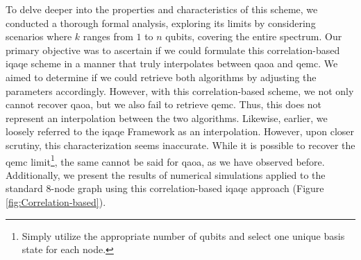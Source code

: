 To delve deeper into the properties and characteristics of this scheme, we conducted a thorough formal analysis, exploring its limits by considering scenarios where $k$ ranges from $1$ to $n$ qubits, covering the entire spectrum. Our primary objective was to ascertain if we could formulate this correlation-based \acrshort{iqaqe} scheme in a manner that truly interpolates between \acrshort{qaoa} and \acrshort{qemc}. We aimed to determine if we could retrieve both algorithms by adjusting the parameters accordingly. However, with this correlation-based scheme, we not only cannot recover \acrshort{qaoa}, but we also fail to retrieve \acrshort{qemc}. Thus, this does not represent an interpolation between the two algorithms. Likewise, earlier, we loosely referred to the \acrshort{iqaqe} Framework as an interpolation. However, upon closer scrutiny, this characterization seems inaccurate. While it is possible to recover the \acrshort{qemc} limit\footnote{Simply utilize the appropriate number of qubits and select one unique basis state for each node.}, the same cannot be said for \acrshort{qaoa}, as we have observed before. Additionally, we present the results of numerical simulations applied to the standard $8$-node graph using this correlation-based \acrshort{iqaqe} approach (Figure \ref{fig:Correlation-based}).

